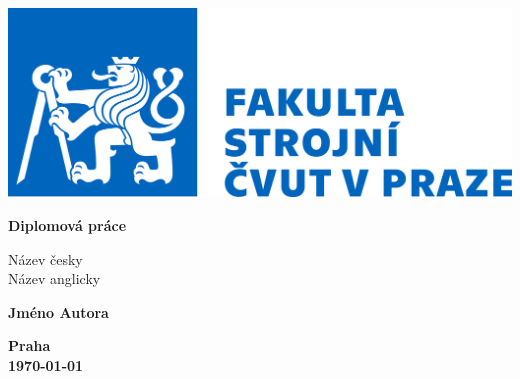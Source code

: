 \begin{titlepage}
    {\selectfont 

        \begin{center}
            \includegraphics[width=1\textwidth]{Images/logo_FS.jpg}
            
            \vspace{4cm}
 
            \Huge
            \textbf{Diplomová práce}
 
            \vspace{0.5cm}
            \LARGE
            Název česky \\
            \vspace{0.5cm}
            \large
            Název anglicky
 
            \vspace{1.5cm}
            
            \LARGE
            \textbf{Jméno Autora}
 
            \vfill

            \vspace{2cm}

            \large
            \textbf{Praha}\\
            \textbf{\today} 
        \end{center}
        }
    \end{titlepage}
    